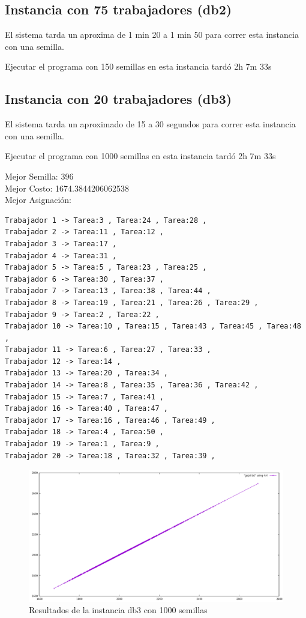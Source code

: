 \documentclass{article}
\begin{document}
\subsection{Instancia con 75 trabajadores (db2)}
El sistema tarda un aproxima de 1 min 20 a 1 min 50 para correr esta instancia con una semilla.

Ejecutar el programa con 150 semillas en esta instancia tardó 2h 7m 33s

\subsection{Instancia con 20 trabajadores (db3)}
El sistema tarda un aproximado de 15 a 30 segundos para correr esta instancia con una semilla.

Ejecutar el programa con 1000 semillas en esta instancia tardó 2h 7m 33s

Mejor Semilla: 396\\
Mejor Costo: 1674.3844206062538\\
Mejor Asignación: 
\begin{lstlisting}
Trabajador 1 -> Tarea:3 , Tarea:24 , Tarea:28 , 
Trabajador 2 -> Tarea:11 , Tarea:12 , 
Trabajador 3 -> Tarea:17 , 
Trabajador 4 -> Tarea:31 , 
Trabajador 5 -> Tarea:5 , Tarea:23 , Tarea:25 , 
Trabajador 6 -> Tarea:30 , Tarea:37 , 
Trabajador 7 -> Tarea:13 , Tarea:38 , Tarea:44 , 
Trabajador 8 -> Tarea:19 , Tarea:21 , Tarea:26 , Tarea:29 , 
Trabajador 9 -> Tarea:2 , Tarea:22 , 
Trabajador 10 -> Tarea:10 , Tarea:15 , Tarea:43 , Tarea:45 , Tarea:48 , 
Trabajador 11 -> Tarea:6 , Tarea:27 , Tarea:33 , 
Trabajador 12 -> Tarea:14 , 
Trabajador 13 -> Tarea:20 , Tarea:34 , 
Trabajador 14 -> Tarea:8 , Tarea:35 , Tarea:36 , Tarea:42 , 
Trabajador 15 -> Tarea:7 , Tarea:41 , 
Trabajador 16 -> Tarea:40 , Tarea:47 , 
Trabajador 17 -> Tarea:16 , Tarea:46 , Tarea:49 , 
Trabajador 18 -> Tarea:4 , Tarea:50 , 
Trabajador 19 -> Tarea:1 , Tarea:9 , 
Trabajador 20 -> Tarea:18 , Tarea:32 , Tarea:39 , 
\end{lstlisting}

\begin{figure}[H]
	\centering
	\includegraphics[scale=0.5]{imgs/gap3.png}
	\caption{Resultados de la instancia db3 con 1000 semillas}
\end{figure}
\end{document}
